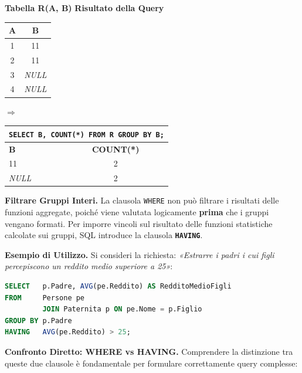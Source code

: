 \documentclass[12pt]{extarticle}
\begin{document}
\begin{center}
\small
\textbf{Tabella R(A, B)} \qquad \qquad \qquad \textbf{Risultato della Query} \\[1ex]
\begin{tabular}{cc}
    \toprule
    \textbf{A} & \textbf{B} \\
    \midrule
    1 & 11 \\
    2 & 11 \\
    3 & \textit{NULL} \\
    4 & \textit{NULL} \\
    \bottomrule
\end{tabular}
\qquad $\Longrightarrow$ \qquad
\begin{tabular}{lc}
    \toprule
    \multicolumn{2}{l}{\texttt{SELECT B, COUNT(*) FROM R GROUP BY B;}} \\
    \midrule
    \textbf{B} & \textbf{COUNT(*)} \\
    \midrule
    11 & 2 \\
    \textit{NULL} & 2 \\
    \bottomrule
\end{tabular}
\end{center}

\noindent \textbf{Filtrare Gruppi Interi.} La clausola \texttt{WHERE} non può filtrare i risultati delle funzioni aggregate, poiché viene valutata logicamente \textbf{prima} che i gruppi vengano formati. Per imporre vincoli sul risultato delle funzioni statistiche calcolate sui gruppi, SQL introduce la clausola \textbf{\texttt{HAVING}}.

\medskip
\noindent \textbf{Esempio di Utilizzo.} Si consideri la richiesta: \textit{«Estrarre i padri i cui figli percepiscono un reddito medio superiore a 25»}:
\begin{lstlisting}[language=SQL]
SELECT   p.Padre, AVG(pe.Reddito) AS RedditoMedioFigli
FROM     Persone pe
         JOIN Paternita p ON pe.Nome = p.Figlio
GROUP BY p.Padre
HAVING   AVG(pe.Reddito) > 25;
\end{lstlisting}

\medskip
\noindent \textbf{Confronto Diretto: WHERE vs HAVING.} Comprendere la distinzione tra queste due clausole è fondamentale per formulare correttamente query complesse:
\end{document}
